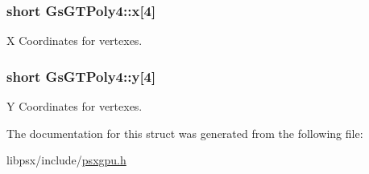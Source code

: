 \subsubsection[{x}]{\setlength{\rightskip}{0pt plus 5cm}short Gs\+G\+T\+Poly4\+::x\mbox{[}4\mbox{]}}\label{structGsGTPoly4_ae9d7d0c778bc80e6e689dad2ccae3fe3}


X Coordinates for vertexes. 

\hypertarget{structGsGTPoly4_a979238f05c29e735ea951c8758c106d3}{}
\subsubsection[{y}]{\setlength{\rightskip}{0pt plus 5cm}short Gs\+G\+T\+Poly4\+::y\mbox{[}4\mbox{]}}\label{structGsGTPoly4_a979238f05c29e735ea951c8758c106d3}


Y Coordinates for vertexes. 



The documentation for this struct was generated from the following file\+:\begin{DoxyCompactItemize}
\item 
libpsx/include/\hyperlink{psxgpu_8h}{psxgpu.\+h}\end{DoxyCompactItemize}
